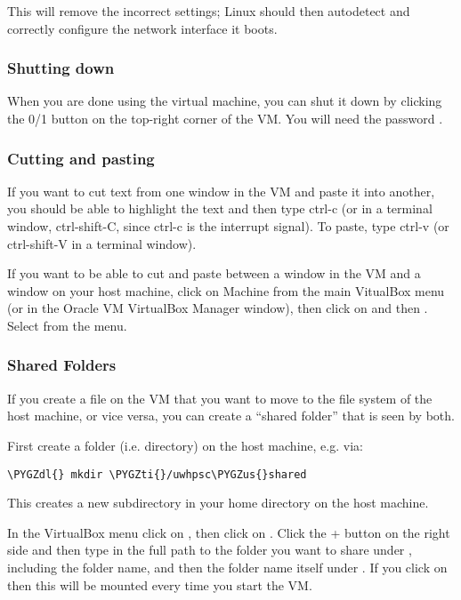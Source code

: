 \documentclass[letterpaper,10pt,english]{sphinxmanual}
\def\PYGZus{\char`\_}
\def\PYGZdl{\char`\$}
\def\PYGZti{\char`\~}
\begin{document}
This will remove the incorrect settings; Linux should then autodetect
and correctly configure the network interface it boots.


\subsubsection{Shutting down}
\label{2013/vm:shutting-down}
When you are done using the virtual machine, you can shut it down by
clicking the 0/1 button on the top-right corner of the VM.
You will need the password .


\subsubsection{Cutting and pasting}
\label{2013/vm:cutting-and-pasting}
If you want to cut text from one window in the VM and paste it into another,
you should be able to highlight the text and then type ctrl-c (or in a
terminal window, ctrl-shift-C, since ctrl-c is the interrupt signal). To
paste, type ctrl-v (or ctrl-shift-V in a terminal window).

If you want to be able to cut and paste between a window in the VM and a
window on your host machine, click on Machine from the main VitualBox menu
(or  in the Oracle VM VirtualBox Manager window), then click on
 and then .  Select  from the  menu.


\subsubsection{Shared Folders}
\label{2013/vm:shared-folders}
If you create a file on the VM that you want to move to the file system of
the host machine, or vice versa, you can create a ``shared folder'' that is
seen by both.

First create a folder (i.e. directory) on the host machine, e.g. via:

\begin{Verbatim}[commandchars=\\\{\}]
\PYGZdl{} mkdir \PYGZti{}/uwhpsc\PYGZus{}shared
\end{Verbatim}

This creates a new subdirectory in your home directory on the host machine.

In the VirtualBox menu click on , then click on
.  Click the + button on the right side and then type in the
full path to the folder you want to share under , including the
folder name, and then the folder name itself under .
If you click on  then this will be mounted every time you start
the VM.
\end{document}
